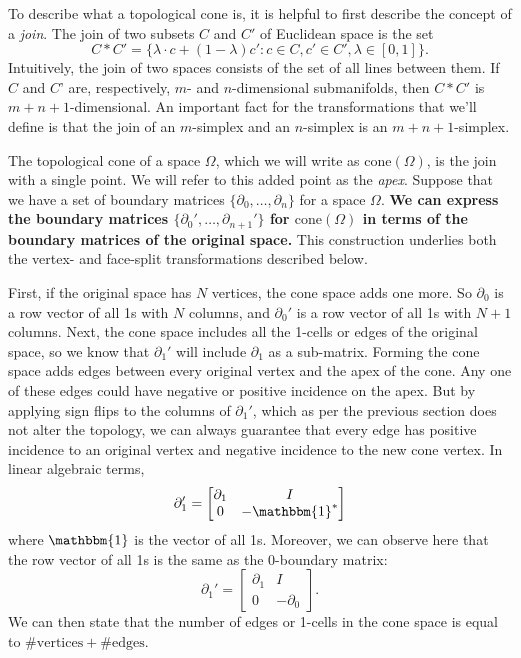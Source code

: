 \documentclass[twocolumn]{article}
\begin{document}
To describe what a topological cone is, it is helpful to first describe the concept of a \emph{join}.
The join of two subsets $C$ and $C'$ of Euclidean space is the set
\begin{equation}
    C * C' = \{\lambda\cdot c + (1 - \lambda)c' : c \in C, c' \in C', \lambda \in [0, 1]\}.
\end{equation}
Intuitively, the join of two spaces consists of the set of all lines between them.
If $C$ and $C$' are, respectively, $m$- and $n$-dimensional submanifolds, then $C * C'$ is $m + n + 1$-dimensional.
An important fact for the transformations that we'll define is that the join of an $m$-simplex and an $n$-simplex is an $m + n + 1$-simplex.

The topological cone of a space $\Omega$, which we will write as $\text{cone}(\Omega)$, is the join with a single point.
We will refer to this added point as the \emph{apex}.
Suppose that we have a set of boundary matrices $\{\partial_0, \ldots, \partial_n\}$ for a space $\Omega$.
\textbf{We can express the boundary matrices $\{\partial_0', \ldots, \partial_{n + 1}'\}$ for $\text{cone}(\Omega)$ in terms of the boundary matrices of the original space.}
This construction underlies both the vertex- and face-split transformations described below.

First, if the original space has $N$ vertices, the cone space adds one more.
So $\partial_0$ is a row vector of all 1s with $N$ columns, and $\partial_0'$ is a row vector of all 1s with $N + 1$ columns.
Next, the cone space includes all the 1-cells or edges of the original space, so we know that $\partial_1'$ will include $\partial_1$ as a sub-matrix.
Forming the cone space adds edges between every original vertex and the apex of the cone.
Any one of these edges could have negative or positive incidence on the apex.
But by applying sign flips to the columns of $\partial_1'$, which as per the previous section does not alter the topology, we can always guarantee that every edge has positive incidence to an original vertex and negative incidence to the new cone vertex.
In linear algebraic terms,
\begin{equation}
    \partial_1' = \left[\begin{matrix}\partial_1 & I \\ 0 & -\mathbbm{1}^*\end{matrix}\right]
\end{equation}
where $\mathbbm{1}$ is the vector of all 1s.
Moreover, we can observe here that the row vector of all 1s is the same as the 0-boundary matrix:
\begin{equation}
    \partial_1' = \left[\begin{matrix}\partial_1 & I \\ 0 & -\partial_0\end{matrix}\right].
    \label{eq:cone-partial1}
\end{equation}
We can then state that the number of edges or 1-cells in the cone space is equal to $\#\text{vertices} + \#\text{edges}$.
\end{document}
